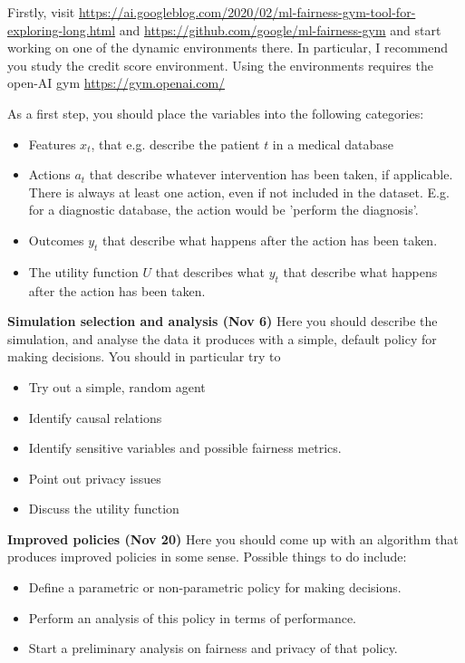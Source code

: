 

Firstly, visit \url{https://ai.googleblog.com/2020/02/ml-fairness-gym-tool-for-exploring-long.html} and  \url{https://github.com/google/ml-fairness-gym} and start working on one of the dynamic environments there. In particular, I recommend you study the credit score environment. Using the environments requires the open-AI gym \url{https://gym.openai.com/}

As a first step, you should place the variables into the following categories:
\begin{itemize}
\item Features $x_t$, that e.g. describe the patient $t$ in a medical database
\item Actions $a_t$ that describe whatever intervention has been taken, if applicable. There is always at least one action, even if not included in the dataset. E.g. for a diagnostic database, the action would be 'perform the diagnosis'.
\item Outcomes $y_t$ that describe what happens after the action has been taken.
\item The utility function $U$ that describes what  $y_t$ that describe what happens after the action has been taken.
\end{itemize}


\textbf{Simulation selection and analysis (Nov 6)} Here you should describe the simulation, and analyse the data it produces with a simple, default policy for making decisions. You should in particular try to
\begin{itemize}
\item Try out a simple, random agent
\item Identify causal relations
\item Identify sensitive variables and possible fairness metrics.
\item Point out privacy issues
\item Discuss the utility function
\end{itemize}

\textbf{Improved policies (Nov 20)} Here you should come up with an algorithm that produces improved policies in some sense. Possible things to do include:
\begin{itemize}
\item Define a parametric or non-parametric policy for making decisions.
\item Perform an analysis of this policy in terms of performance.
\item Start a preliminary analysis on fairness and privacy of that policy.
\end{itemize}


